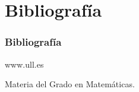 \documentclass{beamer}
\begin{document}

\section{Bibliografía}

\begin{frame}
  \frametitle{Bibliografía}

  \begin{thebibliography}{10}

    \beamertemplatebookbibitems
    www.ull.es
    
    \beamertemplatebookbibitems
    Materia del Grado en Matemáticas.

  \end{thebibliography}
\end{frame}

\end{document}
